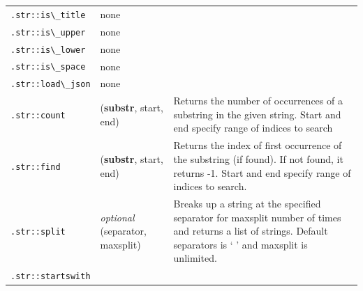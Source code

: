 {\begin{table}[t]
\begin{tabular}{l p{3cm} p{6cm}}
            \lstinline{.str::is\_title}                           & none                                                                                                                                                           &                      \\
            \lstinline{.str::is\_upper}                           & none                                                                                                                                                           &                      \\
            \lstinline{.str::is\_lower}                           & none                                                                                                                                                           &                      \\
            \lstinline{.str::is\_space}                           & none                                                                                                                                                           &                      \\
            \lstinline{.str::load\_json}                          & none                                                                                                                                                           &                      \\
            \lstinline{.str::count}      & (\textbf{substr}, start, end)            & Returns the number of occurrences of a substring in the given string. Start and end specify range of indices to search                                                                \\
            \lstinline{.str::find}       &   (\textbf{substr}, start, end)            & Returns the index of first occurrence of the substring (if found). If not found, it returns -1. Start and end specify range of indices to search.                                     \\
            \lstinline{.str::split}      & \emph{optional} (separator, maxsplit) & Breaks up a string at the specified separator for maxsplit number of times and returns a list of strings. Default separators is ` ' and maxsplit is unlimited.                        \\
            \lstinline{.str::startswith}                          &                                                                                                                                                                &                      \\

\end{tabular}
\end{table}}
